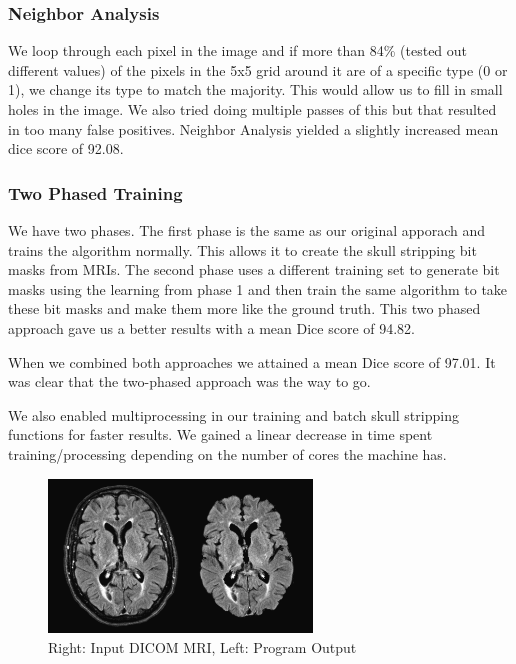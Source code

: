 \documentclass[letterpaper, 10 pt, conference]{ieeeconf}
\begin{document}
\subsubsection{Neighbor Analysis}
We loop through each pixel in the image and if more than 84\% (tested out different values) of the pixels in the 5x5 grid around it are of a specific type (0 or 1), we change its type to match the majority. This would allow us to fill in small holes in the image. We also tried doing  multiple passes of this but that resulted in too many false positives. Neighbor Analysis yielded a slightly increased mean dice score of 92.08.
\subsubsection{Two Phased Training}
We have two phases. The first phase is the same as our original apporach and trains the algorithm normally. This allows it to create the skull stripping bit masks from MRIs. The second phase uses a different training set to generate bit masks using the learning from phase 1 and then train the same algorithm to take these bit masks and make them more like the ground truth. This two phased approach gave us a better results with a mean Dice score of 94.82.

When we combined both approaches we attained a mean Dice score of 97.01. It was clear that the two-phased approach was the way to go.

We also enabled multiprocessing in our training and batch skull stripping functions for faster results. We gained a linear decrease in time spent training/processing depending on the number of cores the machine has.

\begin{figure}
\centering
\includegraphics[width=7cm]{res.png}
\caption{Right: Input DICOM MRI, Left: Program Output}
\end{figure}
\end{document}
